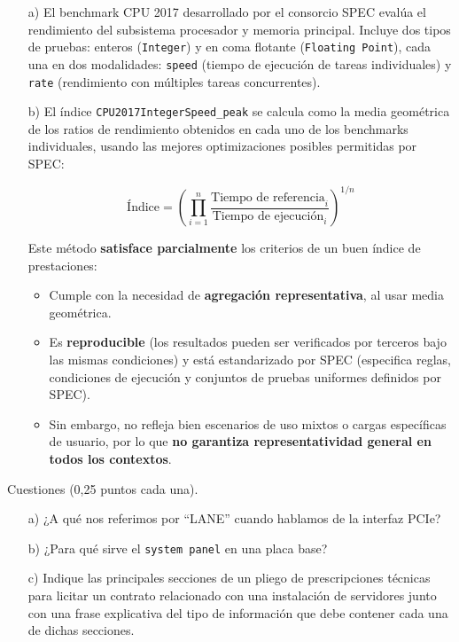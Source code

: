 \documentclass[a4paper,12pt]{article}
\begin{document}
        \begin{enumerate}
            \item[a)] El benchmark CPU 2017 desarrollado por el consorcio SPEC evalúa el rendimiento del subsistema procesador y memoria principal. Incluye dos tipos de pruebas: enteros (\texttt{Integer}) y en coma flotante (\texttt{Floating Point}), cada una en dos modalidades: \texttt{speed} (tiempo de ejecución de tareas individuales) y \texttt{rate} (rendimiento con múltiples tareas concurrentes).
        
            \item[b)] El índice \texttt{CPU2017IntegerSpeed\_peak} se calcula como la media geométrica de los ratios de rendimiento obtenidos en cada uno de los benchmarks individuales, usando las mejores optimizaciones posibles permitidas por SPEC:
        
            \[
            \text{Índice} = \left( \prod_{i=1}^{n} \frac{\text{Tiempo de referencia}_i}{\text{Tiempo de ejecución}_i} \right)^{1/n}
            \]
        
            Este método \textbf{satisface parcialmente} los criterios de un buen índice de prestaciones:
            \begin{itemize}
                \item Cumple con la necesidad de \textbf{agregación representativa}, al usar media geométrica.
                \item Es \textbf{reproducible} (los resultados pueden ser verificados por terceros bajo las mismas condiciones) y está estandarizado por SPEC  (especifica reglas, condiciones de ejecución y conjuntos de pruebas uniformes definidos por SPEC).
                \item Sin embargo, no refleja bien escenarios de uso mixtos o cargas específicas de usuario, por lo que \textbf{no garantiza representatividad general en todos los contextos}.
            \end{itemize}
        \end{enumerate}
        
        \begin{tcolorbox}[colback=gray!10, colframe=black, title=7.- (0.75 puntos)]
        Cuestiones (0,25 puntos cada una).
        \begin{enumerate}
            \item[a)] ¿A qué nos referimos por ``LANE'' cuando hablamos de la interfaz PCIe?
            \item[b)] ¿Para qué sirve el \texttt{system panel} en una placa base?
            \item[c)] Indique las principales secciones de un pliego de prescripciones técnicas para licitar un contrato relacionado con una instalación de servidores junto con una frase explicativa del tipo de información que debe contener cada una de dichas secciones.
        \end{enumerate}
        \end{tcolorbox}
\end{document}
